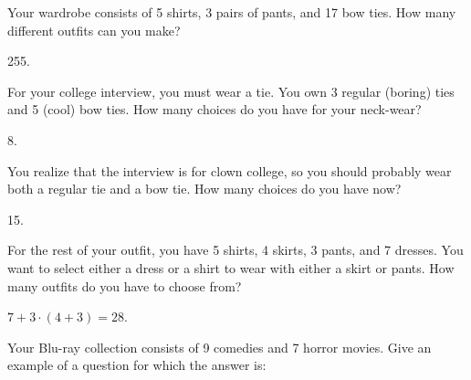 \begin{questions}

\question Your wardrobe consists of 5 shirts, 3 pairs of pants, and 17 bow ties.  How many different outfits can you make?

  \begin{answer}
    255.
  \end{answer}


  
\question For your college interview, you must wear a tie.  You own 3 regular (boring) ties and 5 (cool) bow ties.  How many choices do you have for your neck-wear? 

  \begin{answer}
    8.
  \end{answer}




\question You realize that the interview is for clown college, so you should probably wear both a regular tie and a bow tie.  How many choices do you have now?

  \begin{answer}
    15.
  \end{answer}


\question For the rest of your outfit, you have 5 shirts, 4 skirts, 3 pants, and 7 dresses.  You want to select either a dress or a shirt to wear with either a skirt or pants.  How many outfits do you have to choose from?

	\begin{answer}
		$7 + 3\cdot (4+3) = 28$.
	\end{answer}




\question Your Blu-ray collection consists of 9 comedies and 7 horror movies. Give an example of a question for which the answer is:

  \begin{answer}
\end{answer}
\end{questions}
